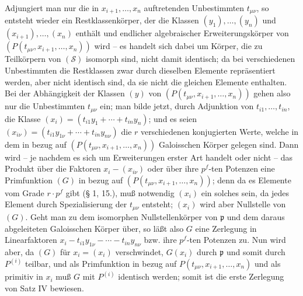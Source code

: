 \documentclass[11pt]{article}
\providecommand{\frakp}{\mathfrak p}
\begin{document}
Adjungiert man nur die in $x_{i+1},\ldots,x_n$ auftretenden Unbestimmten $t_{\mu\nu}$, so entsteht wieder ein Restklassenkörper, der die Klassen $(y_1),\ldots,(y_n)$ und $(x_{i+1}),\ldots,(x_n)$ enthält und endlicher algebraischer Erweiterungskörper von $(P(t_{\mu\nu},x_{i+1},\ldots,x_n))$ wird -- es handelt sich dabei um Körper, die zu Teilkörpern von $(\mathcal S)$ isomorph sind, nicht damit identisch; da bei verschiedenen Unbestimmten die Restklassen zwar durch dieselben Elemente repräsentiert werden, aber nicht identisch sind, da sie nicht die gleichen Elemente enthalten. Bei der Abhängigkeit der Klassen $(y)$ von $(P(t_{\mu\nu},x_{i+1},\ldots,x_n))$ gehen also nur die Unbestimmten $t_{\mu\nu}$ ein; man bilde jetzt, durch Adjunktion von $t_{i1},\ldots,t_{in}$, die Klasse $(x_i)=(t_{i1}y_1+\cdots+t_{in}y_n)$; und es seien $(x_{i\nu})=(t_{i1}y_{1\nu}+\cdots+t_{in}y_{n\nu})$ die $r$ verschiedenen konjugierten Werte, welche in dem in bezug auf $(P(t_{\mu\nu},x_{i+1},\ldots,x_n))$ Galoisschen Körper gelegen sind. Dann wird -- je nachdem es sich um Erweiterungen erster Art handelt oder nicht -- das Produkt über die Faktoren $x_i-(x_{i\nu})$ oder über ihre $p^f$-ten Potenzen eine Primfunktion $(G)$ in bezug auf $(P(t_{\mu\nu},x_{i+1},\ldots,x_n))$; denn da es Elemente vom Grade $r\cdot p^f$ gibt (§ 1, 15.), muß notwendig $(x_i)$ ein solches sein, da jedes Element durch Spezialisierung der $t_{\mu\nu}$ entsteht; $(x_i)$ wird aber Nullstelle von $(G)$. Geht man zu dem isomorphen Nullstellenkörper von $\frakp$ und dem daraus abgeleiteten Galoisschen Körper über, so läßt also $G$ eine Zerlegung in Linearfaktoren $x_i-t_{i1}y_{1\nu}-\cdots-t_{in}y_{n\nu}$ bzw. ihre $p^f$-ten Potenzen zu. Nun wird aber, da $(G)$ für $x_i=(x_i)$ verschwindet, $G(x_i)$ durch $\frakp$ und somit durch $P^{(i)}$ teilbar, und als Primfunktion in bezug auf $P(t_{\mu\nu},x_{i+1},\ldots,x_n)$ und als primitiv in $x_i$ muß $G$ mit $P^{(i)}$ identisch werden; somit ist die erste Zerlegung von Satz IV bewiesen.
\end{document}
